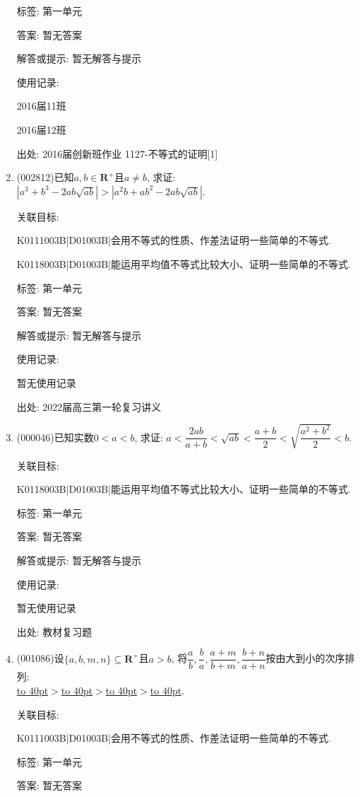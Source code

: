 \documentclass[10pt,a4paper]{article}
\newcommand{\blank}[1]{\underline{\hbox to #1pt{}}}
\begin{document}
\begin{enumerate}[1.]
标签: 第一单元

答案: 暂无答案

解答或提示: 暂无解答与提示

使用记录:

2016届11班	

2016届12班	


出处: 2016届创新班作业	1127-不等式的证明[1]
\item { (002812)}已知$a,b\in \mathbf{R}^+$且$a\ne b$, 求证: $|a^3+b^3-2ab\sqrt{ab}|>|a^2b+ab^2-2ab\sqrt{ab}|$.


关联目标:

K0111003B|D01003B|会用不等式的性质、作差法证明一些简单的不等式.

K0118003B|D01003B|能运用平均值不等式比较大小、证明一些简单的不等式.



标签: 第一单元

答案: 暂无答案

解答或提示: 暂无解答与提示

使用记录:

暂无使用记录


出处: 2022届高三第一轮复习讲义
\item { (000046)}已知实数$0<a<b$, 求证: $a<\dfrac{2ab}{a+b}<\sqrt{ab}<\dfrac{a+b}{2}<\sqrt{\dfrac{a^2+b^2}{2}}<b$.


关联目标:

K0118003B|D01003B|能运用平均值不等式比较大小、证明一些简单的不等式.



标签: 第一单元

答案: 暂无答案

解答或提示: 暂无解答与提示

使用记录:

暂无使用记录


出处: 教材复习题
\item { (001086)}设$\{a,b,m,n\}\subseteq\mathbf{R}^+$且$a>b$, 将$\dfrac{a}{b},\dfrac{b}{a},\dfrac{a+m}{b+m},\dfrac{b+n}{a+n}$按由大到小的次序排列:\\
\blank{40}$>$\blank{40}$>$\blank{40}$>$\blank{40}.


关联目标:

K0111003B|D01003B|会用不等式的性质、作差法证明一些简单的不等式.



标签: 第一单元

答案: 暂无答案


\end{enumerate}
\end{document}
